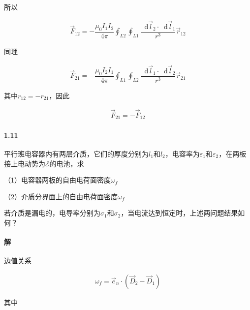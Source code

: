 \documentclass{article}
\newcommand*{\md}{\mathop{}\!\mathrm{d}}
\begin{document}
所以

\begin{equation*}
  \begin{aligned}
    \vec{F}_{12} = - \dfrac{\mu_0 I_1 I_2}{4 \pi} \oint_{L2} \oint_{L1} \dfrac{\md \vec{l}_2 \cdot \md \vec{l}_1}{r^3} \vec{r}_{12}
  \end{aligned}
\end{equation*}

同理

\begin{equation*}
  \begin{aligned}
    \vec{F}_{21} = - \dfrac{\mu_0 I_2 I_1}{4 \pi} \oint_{L1} \oint_{L2} \dfrac{\md \vec{l}_1 \cdot \md \vec{l}_2}{r^3} \vec{r}_{21}
  \end{aligned}
\end{equation*}

其中$r_{12} = - r_{21}$，因此

\begin{equation*}
  \begin{aligned}
    \vec{F}_{21} = - \vec{F}_{12}
  \end{aligned}
\end{equation*}

\paragraph{1.11}

平行班电容器内有两层介质，它们的厚度分别为$l_1$和$l_2$，电容率为$\varepsilon_1$和$\varepsilon_2$，在两板接上电动势为$\mathcal{E}$的电池，求

（1）电容器两板的自由电荷面密度$\omega_f$

（2）介质分界面上的自由电荷面密度$\omega_f$

若介质是漏电的，电导率分别为$\sigma_1$和$\sigma_2$，当电流达到恒定时，上述两问题结果如何？

\paragraph{解}

边值关系

\begin{equation*}
  \begin{aligned}
    \omega_f = \vec{e}_n \cdot \left( \vec{D}_2 - \vec{D}_1 \right)
  \end{aligned}
\end{equation*}

其中
\end{document}
